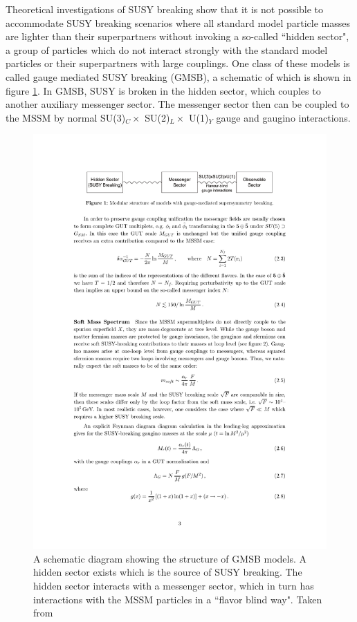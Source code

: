     Theoretical investigations of SUSY breaking show that it is not possible to accommodate SUSY breaking scenarios where all standard model particle masses are lighter than their superpartners without invoking a so-called ``hidden sector", a group of particles which do not interact strongly with the standard model particles or their superpartners with large couplings. One class of these models is called gauge mediated SUSY breaking (GMSB), a schematic of which is shown in figure \ref{fig:gmsb}. In GMSB, SUSY is broken in the hidden sector, which couples to another auxiliary messenger sector. The messenger sector then can be coupled to the MSSM by normal SU(3)$_C \times $ SU(2)$_L \times $ U(1)$_Y $ gauge and gaugino interactions.\cite{gmsb}

    \begin{figure}[h!]
      \centering
      \includegraphics[width=\textwidth]{figures/gmsb.pdf}
      \caption{A schematic diagram showing the structure of GMSB models. A hidden sector exists which is the source of SUSY breaking. The hidden sector interacts with a messenger sector, which in turn has interactions with the MSSM particles in a ``flavor blind way". Taken from \cite{gmsb}}
      \label{fig:gmsb}
    \end{figure}

